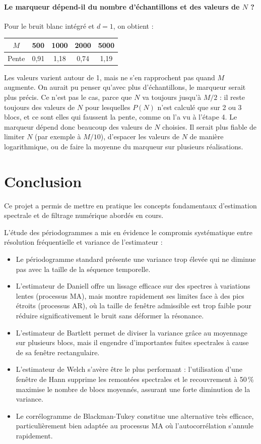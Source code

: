 \documentclass[11pt,a4paper]{article}
\begin{document}
\paragraph{Le marqueur dépend-il du nombre d'échantillons et des valeurs de $N$ ?} Pour le
bruit blanc intégré et $d = 1$, on obtient :
\begin{center}
  \begin{tabular}{|c|c|c|c|c|}
    \hline
    $M$ & 500 & 1000 & 2000 & 5000 \\
    \hline
    Pente & 0,91 & 1,18 & 0,74 & 1,19 \\
    \hline
  \end{tabular}
\end{center}
Les valeurs varient autour de 1, mais ne s'en rapprochent pas quand $M$ augmente. On
aurait pu penser qu'avec plus d'échantillons, le marqueur serait plus précis. Ce n'est pas
le cas, parce que $N$ va toujours jusqu'à $M/2$ : il reste toujours des valeurs de $N$ pour
lesquelles $P(N)$ n'est calculé que sur 2 ou 3 blocs, et ce sont elles qui faussent la
pente, comme on l'a vu à l'étape 4. Le marqueur dépend donc beaucoup des valeurs de $N$
choisies. Il serait plus fiable de limiter $N$ (par exemple à $M/10$), d'espacer les
valeurs de $N$ de manière logarithmique, ou de faire la moyenne du marqueur sur plusieurs
réalisations.

\section{Conclusion}

Ce projet a permis de mettre en pratique les concepts fondamentaux d'estimation spectrale et de filtrage numérique abordés en cours.

L'étude des périodogrammes a mis en évidence le compromis systématique entre résolution fréquentielle et variance de l'estimateur :
\begin{itemize}
    \item Le périodogramme standard présente une variance trop élevée qui ne diminue pas avec la taille de la séquence temporelle.
    \item L'estimateur de Daniell offre un lissage efficace sur des spectres à variations lentes (processus MA), mais montre rapidement ses limites face à des pics étroits (processus AR), où la taille de fenêtre admissible est trop faible pour réduire significativement le bruit sans déformer la résonance.
    \item L'estimateur de Bartlett permet de diviser la variance grâce au moyennage sur plusieurs blocs, mais il engendre d'importantes fuites spectrales à cause de sa fenêtre rectangulaire.
    \item L'estimateur de Welch s'avère être le plus performant : l'utilisation d'une fenêtre de Hann supprime les remontées spectrales et le recouvrement à 50\,\% maximise le nombre de blocs moyennés, assurant une forte diminution de la variance.
    \item Le corrélogramme de Blackman-Tukey constitue une alternative très efficace, particulièrement bien adaptée au processus MA où l'autocorrélation s'annule rapidement.
\end{itemize}
\end{document}
